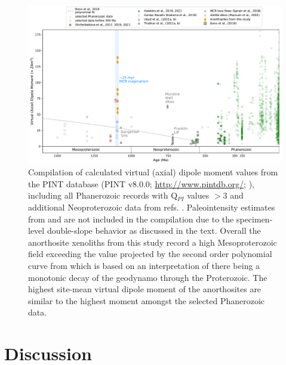\documentclass[9pt,twocolumn,twoside,lineno]{pnas-new}
\begin{document}
\begin{figure}[h!]
\noindent\includegraphics[width=17.8 cm]{PINT_compilation.pdf}
\centering
\caption{\footnotesize{Compilation of calculated virtual (axial) dipole moment values from the PINT database (PINT v8.0.0; \url{http://www.pintdb.org/};  \citealp{Bono2021a}), including all Phanerozoic records with Q$_{PI}$ values $>$3 and additional Neoproterozoic data from refs. \citealp{Lloyd2021a, Lloyd2021b, Thallner2021a, Thallner2021b}. Paleointensity estimates from \cite{Pesonen1983a} and \cite{Kulakov2013a} are not included in the compilation due to the specimen-level double-slope behavior as discussed in the text. Overall the anorthosite xenoliths from this study record a high Mesoproterozoic field exceeding the value projected by the second order polynomial curve from \cite{Bono2019a} which is based on an interpretation of there being a monotonic decay of the geodynamo through the Proterozoic. The highest site-mean virtual dipole moment of the anorthosites are similar to the highest moment amongst the selected Phanerozoic data. }}
\label{fig:PINT_compilation}
\end{figure}

\section*{Discussion}

\end{document}
